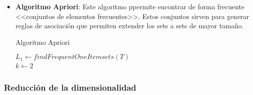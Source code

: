 \begin{itemize}
  \item \textbf{Algoritmo Apriori}: Este algoritmo ppermite encontrar de forma frecuente <<conjuntos de elementos frecuentes>>. Estos conjuntos sirven para generar reglas de asociación que permiten extender los sets a sets de mayor tamaño.

        \begin{algorithm}[H]
          \caption{Algoritmo Apriori}

          \BlankLine
          \BlankLine

          $L_1 \gets findFrequentOneItemsets(T)$\\
          $k \gets $2\\

          \BlankLine

          \BlankLine

        \end{algorithm}

\end{itemize}

\subsubsection{Reducción de la dimensionalidad}

